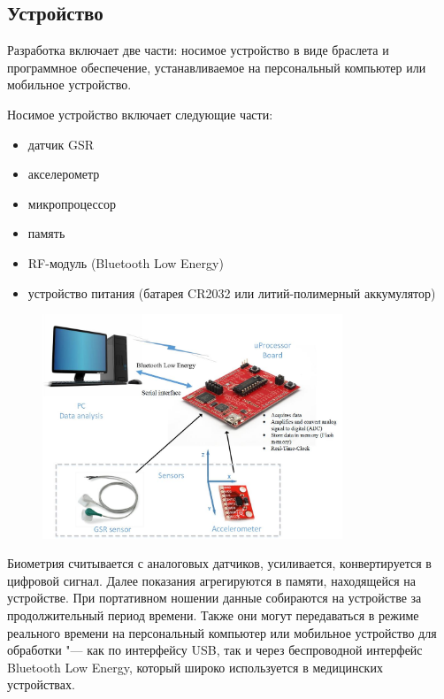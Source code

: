 \documentclass[10pt, a5paper]{article}
\begin{document}
\subsection*{Устройство}

Разработка включает две части: носимое устройство в виде браслета и программное обеспечение, устанавливаемое на персональный компьютер или мобильное устройство.

Носимое устройство включает следующие части:

\begin{itemize}
  \item датчик GSR
  \item акселерометр
  \item микропроцессор
  \item память
  \item RF-модуль (Bluetooth Low Energy)
  \item устройство питания (батарея CR2032 или литий-полимерный аккумулятор)
\end{itemize}

\begin{figure}[b!]
  \centering
  \includegraphics[width=0.8\textwidth]{107_2014_w_Karabutova_struct.png}
\end{figure}

Биометрия считывается с аналоговых датчиков, усиливается, конвертируется в цифровой сигнал. Далее показания агрегируются в памяти, находящейся на устройстве. При портативном ношении данные собираются на устройстве за продолжительный период времени. Также они могут передаваться в режиме реального времени на персональный компьютер или мобильное устройство для обработки "--- как по интерфейсу USB, так и через беспроводной интерфейс Bluetooth Low Energy, который широко используется в медицинских устройствах.
\end{document}
